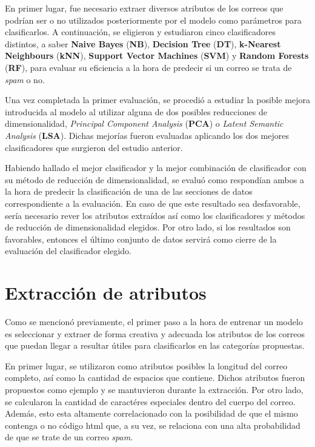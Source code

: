 \documentclass{article}
\begin{document}
En primer lugar, fue necesario extraer diversos atributos de los correos que podrían ser o no utilizados posteriormente por el modelo como parámetros para clasificarlos. A continuación, se eligieron y estudiaron cinco clasificadores distintos, a saber \textbf{Naive Bayes} (\textbf{NB}), \textbf{Decision Tree} (\textbf{DT}), \textbf{k-Nearest Neighbours} (\textbf{kNN}), \textbf{Support Vector Machines} (\textbf{SVM}) y \textbf{Random Forests} (\textbf{RF}), para evaluar su eficiencia a la hora de predecir si un correo se trata de \textit{spam} o no.

Una vez completada la primer evaluación, se procedió a estudiar la posible mejora introducida al modelo al utilizar alguna de dos posibles reducciones de dimensionalidad, \textit{Principal Component Analysis} (\textbf{PCA}) o \textit{Latent Semantic Analysis} (\textbf{LSA}). Dichas mejorías fueron evaluadas aplicando los dos mejores clasificadores que surgieron del estudio anterior.

Habiendo hallado el mejor clasificador y la mejor combinación de clasificador con su método de reducción de dimensionalidad, se evaluó como respondían ambos a la hora de predecir la clasificación de una de las secciones de datos correspondiente a la evaluación. En caso de que este resultado sea desfavorable, sería necesario rever los atributos extraídos así como los clasificadores y métodos de reducción de dimensionalidad elegidos. Por otro lado, si los resultados son favorables, entonces el último conjunto de datos servirá como cierre de la evaluación del clasificador elegido.

\section{Extracción de atributos}

Como se mencionó previamente, el primer paso a la hora de entrenar un modelo es seleccionar y extraer de forma creativa y adecuada los atributos de los correos que puedan llegar a resultar útiles para clasificarlos en las categorías propuestas.

En primer lugar, se utilizaron como atributos posibles la longitud del correo completo, así como la cantidad de espacios que contiene. Dichos atributos fueron propuestos como ejemplo y se mantuvieron durante la extracción. Por otro lado, se calcularon la cantidad de caractéres especiales dentro del cuerpo del correo. Además, esto esta altamente correlacionado con la posibilidad de que el mismo contenga o no código html que, a su vez, se relaciona con una alta probabilidad de que se trate de un correo \textit{spam}.
\end{document}
